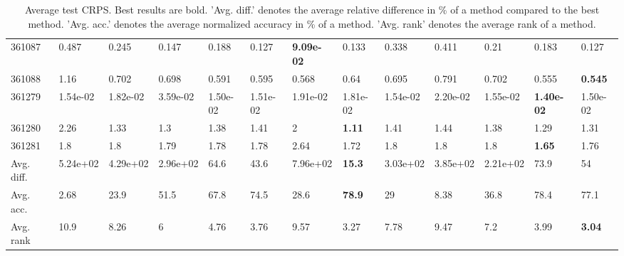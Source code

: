 \begin{table}[ht!]
\begin{tabular}{lllllllllllll}
  361087 & 0.487 & 0.245 & 0.147 & 0.188 & 0.127 & \textbf{9.09e-02} & 0.133 & 0.338 & 0.411 & 0.21 & 0.183 & 0.127 \\ 
  361088 & 1.16 & 0.702 & 0.698 & 0.591 & 0.595 & 0.568 & 0.64 & 0.695 & 0.791 & 0.702 & 0.555 & \textbf{0.545} \\ 
  361279 & 1.54e-02 & 1.82e-02 & 3.59e-02 & 1.50e-02 & 1.51e-02 & 1.91e-02 & 1.81e-02 & 1.54e-02 & 2.20e-02 & 1.55e-02 & \textbf{1.40e-02} & 1.50e-02 \\ 
  361280 & 2.26 & 1.33 & 1.3 & 1.38 & 1.41 & 2 & \textbf{1.11} & 1.41 & 1.44 & 1.38 & 1.29 & 1.31 \\ 
  361281 & 1.8 & 1.8 & 1.79 & 1.78 & 1.78 & 2.64 & 1.72 & 1.8 & 1.8 & 1.8 & \textbf{1.65} & 1.76 \\ 
   \hline
Avg. diff. & 5.24e+02 & 4.29e+02 & 2.96e+02 & 64.6 & 43.6 & 7.96e+02 & \textbf{15.3} & 3.03e+02 & 3.85e+02 & 2.21e+02 & 73.9 & 54 \\ 
  Avg. acc. & 2.68 & 23.9 & 51.5 & 67.8 & 74.5 & 28.6 & \textbf{78.9} & 29 & 8.38 & 36.8 & 78.4 & 77.1 \\ 
  Avg. rank & 10.9 & 8.26 & 6 & 4.76 & 3.76 & 9.57 & 3.27 & 7.78 & 9.47 & 7.2 & 3.99 & \textbf{3.04} \\ 
   \hline
\hline
\end{tabular}
\endgroup
\caption{Average test CRPS. 
                  Best results are bold. 
                  'Avg. diff.' denotes the average relative difference in \% of a method compared to the best method.
                  'Avg. acc.' denotes the average normalized accuracy in \% of a method.
                  'Avg. rank' denotes the average rank of a method.} 
\label{TABLES/table_results_CRPS}
\end{table}
